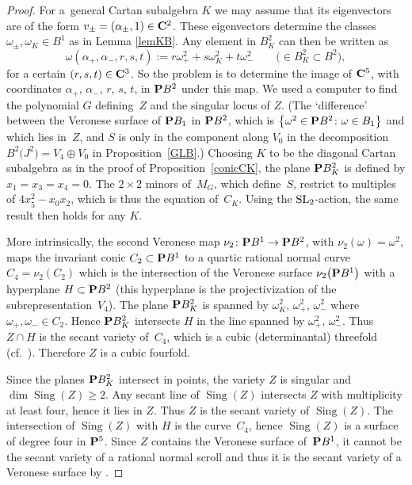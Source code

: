 \documentclass[10pt,a4paper]{amsart}
\numberwithin{equation}{section}
\begin{document}
\begin{proof}
For a~general Cartan subalgebra $K$ we may assume that its eigenvectors
are of the form $v_\pm=(\alpha_\pm,1)\in{\bf C}^2$.
These eigenvectors determine the classes $\omega_\pm,\omega_K\in B^1$ as in
Lemma \ref{lemKB}.
Any element in $B^2_K$ can then be written as
\[
\omega(\alpha_+,\alpha_-,r,s,t) := r\omega_+^2 + s\omega^2_K + t\omega^2_-\qquad
\big(\!\!\in B_K^2\subset B^2\big),
\]
for a certain $(r,s,t)\in {\bf C}^3$. So the problem is to determine the image of ${\bf C}^5$,
with coordinates $\alpha_+$, $\alpha_-$, $r$, $s$, $t$, in ${\bf P} B^2$ under this map.
We used a computer to find the polynomial $G$ defining~$Z$ and the singular locus of $Z$.
(The `difference' between the Veronese surface of ${\bf P} B_1$ in ${\bf P} B^2$, which is
$\big\{\omega^2\in{\bf P} B^2\colon \omega\in B_1\big\}$ and which lies in~$Z$,
and $S$ is only in the component along $V_0$ in the decomposition
$B^2\big(J^2\big)=V_4\oplus V_0$ in Proposition~\ref{GLB}.)
Choosing $K$ to be the diagonal Cartan subalgebra as in the proof of Proposition~\ref{conicCK},
the plane ${\bf P} B^2_K$ is defined by $x_1=x_3=x_4=0$. The $2\times 2$ minors of~$M_G$,
which define~$S$, restrict to multiples of $4x_5^2-x_0x_2$, which is thus the equation of~$C_K$.
Using the ${\rm SL}_2$-action, the same result then holds for any $K$.

More intrinsically, the second Veronese map $\nu_2\colon {\bf P} B^1\rightarrow{\bf P} B^2$, with
$\nu_2(\omega)=\omega^2$, maps the invariant conic $C_2\subset{\bf P} B^1$ to
a quartic rational normal curve $C_4=\nu_2(C_2)$ which is the intersection of the Veronese surface
$\nu_2\big({\bf P} B^1\big)$ with a hyperplane $H\subset{\bf P} B^2$ (this hyperplane is the projectivization of
the subrepresentation~$V_4$).
The plane ${\bf P} B^2_K$ is spanned by $\omega_K^2$, $\omega_+^2$, $\omega_-^2$ where
$\omega_+,\omega_-\in C_2$. Hence ${\bf P} B^2_K$ intersects $H$ in the line spanned by
$\omega_+^2$, $\omega_-^2$. Thus $Z\cap H$ is the secant variety of~$C_4$, which is a cubic
(determinantal) threefold
(cf.\ \cite[Proposition~9.7]{Harris}). Therefore $Z$ is a cubic fourfold.

Since the planes ${\bf P} B^2_K$ intersect in points, the variety $Z$ is singular
and $\dim\operatorname{Sing}(Z)\geq 2$.
Any secant line of $\operatorname{Sing}(Z)$ intersects $Z$ with multiplicity at least four,
hence it lies in $Z$. Thus $Z$ is the secant variety of $\operatorname{Sing}(Z)$. The intersection
of $\operatorname{Sing}(Z)$ with $H$ is the curve~$C_4$, hence $\operatorname{Sing}(Z)$ is a surface of degree four
in ${\bf P}^5$. Since $Z$ contains the Veronese surface of~${\bf P} B^1$, it cannot be the secant variety
of a rational normal scroll and thus it is the secant variety of a Veronese surface by
\cite[Proposition, p.~525]{GH}.
\end{proof}
\end{document}
